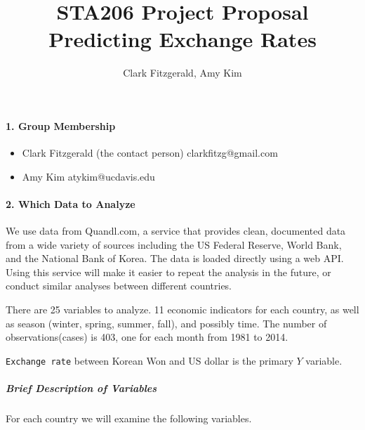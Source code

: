 \documentclass[12pt]{article}
\title{STA206 Project Proposal \\ Predicting Exchange Rates}
\author{Clark Fitzgerald, Amy Kim}
\begin{document}
\maketitle
\paragraph{1. Group Membership}
\begin{itemize}
    \item Clark Fitzgerald (the contact person) clarkfitzg@gmail.com
    \item Amy Kim atykim@ucdavis.edu
\end{itemize}

\paragraph{2. Which Data to Analyze}

We use data from Quandl.com, a service that provides clean, documented
data from a wide variety of sources including the US Federal Reserve,
World Bank, and the National Bank of Korea. The data is loaded directly using a
web API.
Using this service will make it easier
to repeat the analysis in the future, or conduct similar analyses between
different countries.

There are 25 variables to analyze. 11 economic indicators for each country,
as well as season (winter, spring, summer, fall),  and possibly time.
The number of observations(cases) is 403, one for each month from 1981 to 2014.

{\tt Exchange rate} between Korean Won and US dollar is the primary $Y$
variable.


\subparagraph{Brief Description of Variables}
For each country we will examine the following variables.
\end{document}
